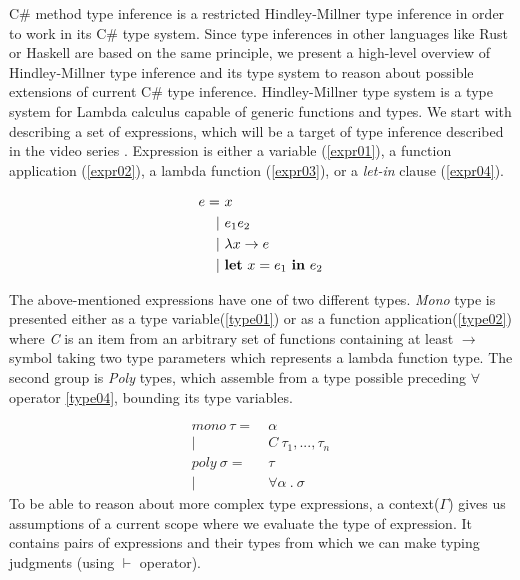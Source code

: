 C\# method type inference is a restricted Hindley-Millner type inference in order to work in its C\# type system.
Since type inferences in other languages like Rust or Haskell are based on the same principle, we present a high-level overview of Hindley-Millner type inference and its type system to reason about possible extensions of current C\# type inference.
Hindley-Millner type system \cite{online:wikiHM} is a type system for Lambda calculus capable of generic functions and types.
We start with describing a set of expressions, which will be a target of type inference described in the video series \cite{online:HMVideos}.
Expression is either a variable (\ref{expr01}), a function application (\ref{expr02}), a lambda function (\ref{expr03}), or a \textit{let-in} clause (\ref{expr04}).
\par
\begin{align}
e =&\ x\label{expr01}\\
|&\ e_1 e_2\label{expr02}\\
|&\ \lambda x \rightarrow e\label{expr03}\\
|&\ \text{\textbf{let}}\ x = e_1\ \text{\textbf{in}}\ e_2\label{expr04} 
\end{align}
\par
The above-mentioned expressions have one of two different types.
\textit{Mono} type is presented either as a type variable(\ref{type01}) or as a function application(\ref{type02}) where \textit{C} is an item from an arbitrary set of functions containing at least \texttt{$\rightarrow$} symbol taking two type parameters which represents a lambda function type.
The second group is \textit{Poly} types, which assemble from a type possible preceding $\forall$ operator \ref{type04}, bounding its type variables.
\par
\begin{align}
mono\ \tau =&\ \alpha\label{type01}\\
|&\ C\ \tau_1,...,\tau_n\label{type02}\\
poly\ \sigma =&\ \tau\label{type03}\\
|&\ \forall \alpha\ .\ \sigma\label{type04}
\end{align}
To be able to reason about more complex type expressions, a context(\texttt{$\Gamma$}) gives us assumptions of a current scope where we evaluate the type of expression.
It contains pairs of expressions and their types from which we can make typing judgments (using \texttt{$\vdash$} operator). 
\par
